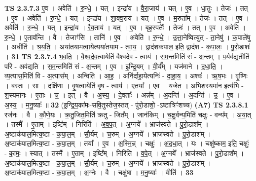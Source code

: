 \documentclass[17pt]{extarticle}
\begin{document}
                  \newline
                                \textbf{ TS 2.3.7.3} \newline
                  ए॒व । अवेति॑ । रु॒न्धे॒ । यत् । इन्द्रा॑य । वै॒रा॒जाय॑ । यत् । ए॒व । धा॒तुः । तेजः॑ । तत् । ए॒व । अवेति॑ । रु॒न्धे॒ । यत् । इन्द्रा॑य । शा॒क्व॒राय॑ । यत् । ए॒व । म॒रुता᳚म् । तेजः॑ । तत् । ए॒व । अवेति॑ । रु॒न्धे॒ । यत् । इन्द्रा॑य । रै॒व॒ताय॑ । यत् । ए॒व । बृह॒स्पतेः᳚ । तेजः॑ । तत् । ए॒व । अवेति॑ । रु॒न्धे॒ । ए॒ताव॑न्ति । वै । तेजाꣳ॑सि । तानि॑ । ए॒व । अवेति॑ । रु॒न्धे॒ । उ॒त्ता॒नेष्वित्यु॑त् - ता॒नेषु॑ । क॒पाले॑षु । अधीति॑ । श्र॒य॒ति॒ । अया॑तयामत्वा॒येत्यया॑तयाम - त्वा॒य॒ । द्वाद॑शकपाल॒ इति॒ द्वाद॑श - क॒पा॒लः॒ । पु॒रो॒डाशः॑ । \textbf{  31} \newline
                  \newline
                                \textbf{ TS 2.3.7.4} \newline
                  भ॒व॒ति॒ । वै॒श्व॒दे॒व॒त्वायेति॑ वैश्वदेव - त्वाय॑ । स॒म॒न्तमिति॑ सं - अ॒न्तम् । प॒र्यव॑द्य॒तीति॑ परि - अव॑द्यति । स॒म॒न्तमिति॑ सं - अ॒न्तम् । ए॒व ।  इ॒न्द्रि॒यम् । वी॒र्य᳚म् । यज॑माने । द॒धा॒ति॒ । व्य॒त्यास॒मिति॑ वि - अ॒त्यास᳚म् । अन्विति॑ । आ॒ह॒ । अनि॑र्दाहा॒येत्यनिः॑ - दा॒हा॒य॒ । अश्वः॑ ।   ऋ॒ष॒भः । वृ॒ष्णिः । ब॒स्तः । सा । दक्षि॑णा । वृ॒ष॒त्वायेति॑ वृष - त्वाय॑ । ए॒तया᳚ । ए॒व । य॒जे॒त॒ । अ॒भि॒श॒स्यमा॑न॒ इत्य॑भि - श॒स्यमा॑नः । ए॒ताः । च॒ । इत् । वै । अ॒स्य॒ । दे॒वताः᳚ । अन्न᳚म् । अ॒दन्ति॑ । अ॒दन्ति॑ । उ॒ । ए॒व । अ॒स्य॒ । म॒नु॒ष्याः᳚ ॥ \textbf{  32 } \newline
                  \newline
                      (इ॒न्द्रि॒य॒का॑मः-सवि॒तुस्तेज॒स्तत् - पु॑रो॒डाशो॒ -ऽष्टात्रिꣳ॑शच्च)  \textbf{(A7)} \newline \newline
                                \textbf{ TS 2.3.8.1} \newline
                  रज॑नः । वै । कौ॒णे॒यः । क्र॒तु॒जित॒मिति॑ क्रतु - जित᳚म् । जान॑किम् । च॒क्षु॒र्वन्य॒मिति॑ चक्षुः - वन्य᳚म् । अ॒या॒त् । तस्मै᳚ । ए॒ताम् । इष्टि᳚म् । निरिति॑ । अ॒व॒प॒त् । अ॒ग्नये᳚ । भ्राज॑स्वते । पु॒रो॒डाश᳚म् । अ॒ष्टाक॑पाल॒मित्य॒ष्टा - क॒पा॒ल॒म् । सौ॒र्यम् । च॒रुम् । अ॒ग्नये᳚ । भ्राज॑स्वते । पु॒रो॒डाश᳚म् । अ॒ष्टाक॑पाल॒मित्य॒ष्टा - क॒पा॒ल॒म् । तया᳚ । ए॒व । अ॒स्मि॒न्न् । चक्षुः॑ । अ॒द॒धा॒त् । यः । चक्षु॑ष्काम॒ इति॒ चक्षुः॑ - का॒मः॒ । स्यात् । तस्मै᳚ । ए॒ताम् । इष्टि᳚म् । निरिति॑ । व॒पे॒त् । अ॒ग्नये᳚ । भ्राज॑स्वते । पु॒रो॒डाश᳚म् । अ॒ष्टाक॑पाल॒मित्य॒ष्टा - क॒पा॒ल॒म् । सौ॒र्यम् । च॒रुम् । अ॒ग्नये᳚ । भ्राज॑स्वते । पु॒रो॒डाश᳚म् । अ॒ष्टाक॑पाल॒मित्य॒ष्टा - क॒पा॒ल॒म् । अ॒ग्नेः । वै । चक्षु॑षा । म॒नु॒ष्याः᳚ । वीति॑ । \textbf{  33} \newline
\end{document}

